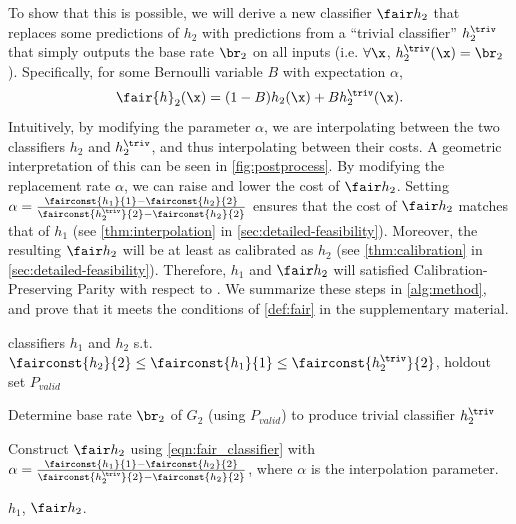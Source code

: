 To show that this is possible, we will derive a new classifier $\fair h_2$ that
replaces some predictions of $h_2$ with predictions from a ``trivial
classifier'' $h^\triv_2$ that simply outputs the base rate $\br_2$
on all inputs (i.e. $\forall \x$, $h^\triv_2(\x) = \br_2$).
Specifically, for some Bernoulli variable $B$ with expectation $\alpha$,
%
\begin{equation}
  \fair{h}_2(\x) = (1 - B) h_2(\x) + B h^\triv_2(\x).
  \label{eqn:fair_classifier}
\end{equation}
%
Intuitively, by modifying the parameter $\alpha$, we are interpolating between the two classifiers
$h_2$ and $h^\triv_2$, and thus interpolating between their costs.
A geometric interpretation of this can be seen in \autoref{fig:postprocess}.
By modifying the replacement rate $\alpha$, we can raise and lower the cost of $\fair h_2$.
Setting
$ \alpha = \frac{\fairconst{h_1}{1} - \fairconst{h_2}{2}}{\fairconst{h^\triv_2}{2} - \fairconst{h_2}{2}}$
ensures that the cost of $\fair h_2$ matches that of $h_1$ (see \autoref{thm:interpolation}
in \autoref{sec:detailed-feasibility}).
Moreover, the resulting $\fair h_2$ will be at least as calibrated as $h_2$
(see \autoref{thm:calibration} in \autoref{sec:detailed-feasibility}).
Therefore, $h_1$ and $\fair h_2$ will satisfied
Calibration-Preserving Parity with respect to \fairconstname.
We summarize these steps in \autoref{alg:method}, and prove that it meets the
conditions of \autoref{def:fair} in the supplementary material.
%
\begin{algorithm}
  \caption{\methodname{} by post-processing}
  \label{alg:method}
  \begin{algorithmic}
     classifiers $h_1$ and $h_2$ s.t.
    $\fairconst{h_2}{2} \leq \fairconst{h_1}{1} \leq \fairconst{h^\triv_2}{2}$, holdout set $P_{valid}$

    \begin{itemize}
      \STATE Determine base rate $\br_2$ of $G_2$ (using
        $P_{valid}$) to produce trivial classifier $h^\triv_2$

      \STATE Construct $\fair h_2$ using \eqref{eqn:fair_classifier} with
        $ \alpha = \frac{\fairconst{h_1}{1} - \fairconst{h_2}{2}}{\fairconst{h^\triv_2}{2} - \fairconst{h_2}{2}}$,
        where $\alpha$ is the interpolation parameter.
    \end{itemize}

    \RETURN $h_1$, $\fair h_2$.
  \end{algorithmic}
\end{algorithm}

